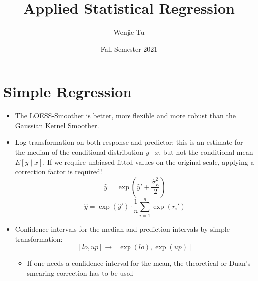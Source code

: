 \documentclass[a4paper]{article}
\title{%
    Applied Statistical Regression 
}
\author{Wenjie Tu}
\date{Fall Semester 2021}
\begin{document}

\section{Simple Regression}
\begin{itemize}
    \item The LOESS-Smoother is better, more flexible and more robust than the Gaussian Kernel Smoother.
    \item Log-transformation on both response and predictor: this is an estimate for the median of the conditional distribution $y\mid x$, but not the conditional mean $E[y\mid x]$. If we require unbiased fitted values on the original scale, applying a correction factor is required!
    \[\hat{y}=\exp(\hat{y}'+\frac{\hat{\sigma}_E^2}{2}) \]
    \[\hat{y}=\exp(\hat{y}')\cdot\frac{1}{n}\sum_{i=1}^n\exp(r_i') \]
    \item Confidence intervals for the median and prediction intervals by simple transformation:
    \[[lo,up]\to[\exp(lo),\exp(up)] \]
    \begin{itemize}
        \item If one needs a confidence interval for the mean, the theoretical or Duan's smearing correction has to be used
    \end{itemize}
\end{itemize}
\end{document}
